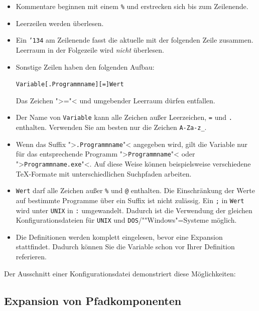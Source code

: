 \documentclass[12pt,ngerman,a4paper,fullparskip]{report}
\newcommand{\acro}[1]{\texttt{#1}}
\newcommand{\code}[1]{\texttt{#1}}
\newcommand{\var}[1]{\texttt{#1}}
\newcommand{\samp}[1]{\texttt{#1}}
\newcommand{\bs}{\protect\normalfont\ttfamily\char'134}
\begin{document}
\begin{itemize}
\item
  Kommentare beginnen mit einem \code{\%} und erstrecken sich bis zum
  Zeilenende.
\item
  Leerzeilen werden überlesen.
\item
  Ein \samp{\bs} am Zeilenende fasst die aktuelle mit der folgenden Zeile
  zusammen. Leerraum in der Folgezeile wird \emph{nicht} überlesen.
\item
  Sonstige Zeilen haben den folgenden Aufbau:

\begin{alltt}
  \var{Variable}[.\var{Programmname}] [=] \var{Wert}
\end{alltt}%

  Das Zeichen ">="< und umgebender Leerraum dürfen entfallen.
\item
  Der Name von \var{Variable} kann alle Zeichen außer Leerzeichen,
  \samp{=} und \samp{.} enthalten. Verwenden Sie am besten nur die Zeichen
  \samp{A-Za-z\_}.
\item
  Wenn das Suffix ">\code{.\var{Programmname}}"< angegeben wird, gilt die
  Variable nur für das entsprechende Programm ">\var{Programmname}"< oder
  ">\code{\var{Programmname}.exe}"<. Auf diese Weise können
  beispielsweise verschiedene
  \TeX-Formate mit unterschiedlichen Suchpfaden arbeiten.
\item
  \texttt{\var{Wert}} darf alle Zeichen außer \texttt{\%} und \texttt{@}
  enthalten.
  Die Einschränkung der Werte auf bestimmte Programme über ein Suffix
  ist nicht zulässig. Ein \samp{;} in \texttt{\var{Wert}} wird unter
  \acro{UNIX} in \samp{:} umgewandelt. Dadurch ist die Verwendung der gleichen
  Konfigurationsdateien für \acro{UNIX} und \acro{DOS}/""Windows"=Systeme möglich.
\item
  Die Definitionen werden komplett eingelesen, bevor eine Expansion
  stattfindet. Dadurch können Sie die Variable schon vor Ihrer Definition
  referieren.
\end{itemize}

Der Ausschnitt einer Konfigurationsdatei demonstriert diese
Möglichkeiten:




\subsection{Expansion von Pfadkomponenten}
\end{document}
